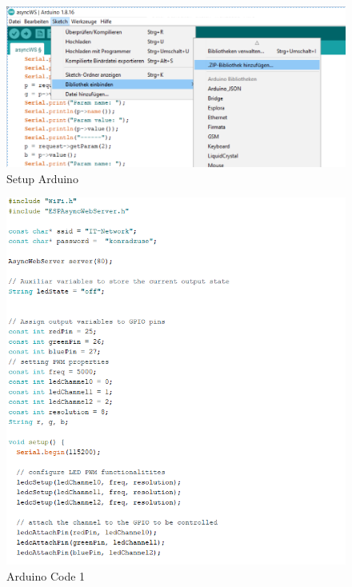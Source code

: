 \begin{figure}[h]
\begin{center}
\includegraphics[width=15cm]{img/arduinosetup1.png}
\caption{Setup Arduino}
\label{arduinosetup1}
\end{center}
\end{figure}

\begin{figure}[h]
\begin{center}
\includegraphics[width=15cm]{img/arduinocode1.png}
\caption{Arduino Code 1}
\label{arduinocode1}
\end{center}
\end{figure}

